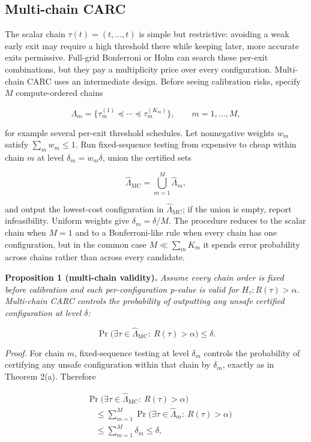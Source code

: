 \documentclass{ieeeaccess}
\begin{document}
\subsection{Multi-chain CARC}

The scalar chain $\tau(t)=(t,\dots,t)$ is simple but restrictive: avoiding a weak early exit may require a high threshold there while keeping later, more accurate exits permissive. Full-grid Bonferroni or Holm can search these per-exit combinations, but they pay a multiplicity price over every configuration. Multi-chain CARC uses an intermediate design. Before seeing calibration risks, specify $M$ compute-ordered chains

\[
\Lambda_m=\{\tau^{(1)}_m\preceq\cdots\preceq\tau^{(K_m)}_m\},\qquad m=1,\dots,M,
\]

for example several per-exit threshold schedules. Let nonnegative weights $w_m$ satisfy $\sum_m w_m\le1$. Run fixed-sequence testing from expensive to cheap within chain $m$ at level $\delta_m=w_m\delta$, union the certified sets

\[
\hat\Lambda_{\mathrm{MC}}=\bigcup_{m=1}^M \hat\Lambda_m,
\]

and output the lowest-cost configuration in $\hat\Lambda_{\mathrm{MC}}$; if the union is empty, report infeasibility. Uniform weights give $\delta_m=\delta/M$. The procedure reduces to the scalar chain when $M=1$ and to a Bonferroni-like rule when every chain has one configuration, but in the common case $M\ll\sum_m K_m$ it spends error probability across chains rather than across every candidate.

\textbf{Proposition 1 (multi-chain validity).} \emph{Assume every chain order is fixed before calibration and each per-configuration p-value is valid for $H_\tau:R(\tau)>\alpha$. Multi-chain CARC controls the probability of outputting any unsafe certified configuration at level $\delta$:}

\[
\Pr\big(\exists \tau\in\hat\Lambda_{\mathrm{MC}}:\ R(\tau)>\alpha\big)\le\delta .
\]

\emph{Proof.} For chain $m$, fixed-sequence testing at level $\delta_m$ controls the probability of certifying any unsafe configuration within that chain by $\delta_m$, exactly as in Theorem 2(a). Therefore

\[
\begin{aligned}
&\Pr\big(\exists \tau\in\hat\Lambda_{\mathrm{MC}}:\ R(\tau)>\alpha\big)\\
&\quad\le \sum_{m=1}^M
\Pr\big(\exists \tau\in\hat\Lambda_m:\ R(\tau)>\alpha\big)\\
&\quad\le \sum_{m=1}^M \delta_m
\le \delta,
\end{aligned}
\]
\end{document}
